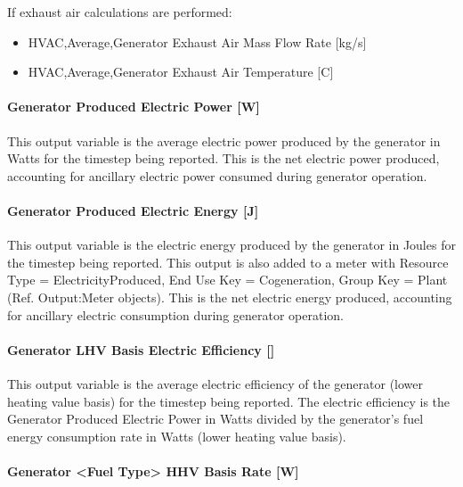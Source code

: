 If exhaust air calculations are performed:

\begin{itemize}
\item
  HVAC,Average,Generator Exhaust Air Mass Flow Rate {[}kg/s{]}
\item
  HVAC,Average,Generator Exhaust Air Temperature {[}C{]}
\end{itemize}

\paragraph{Generator Produced Electric Power {[}W{]}}\label{generator-produced-electric-power-w-1}

This output variable is the average electric power produced by the generator in Watts for the timestep being reported. This is the net electric power produced, accounting for ancillary electric power consumed during generator operation.

\paragraph{Generator Produced Electric Energy {[}J{]}}\label{generator-produced-electric-energy-j-1}

This output variable is the electric energy produced by the generator in Joules for the timestep being reported. This output is also added to a meter with Resource Type = ElectricityProduced, End Use Key = Cogeneration, Group Key = Plant (Ref. Output:Meter objects). This is the net electric energy produced, accounting for ancillary electric consumption during generator operation.

\paragraph{Generator LHV Basis Electric Efficiency {[]}}\label{generator-lhv-basis-electric-efficiency}

This output variable is the average electric efficiency of the generator (lower heating value basis) for the timestep being reported. The electric efficiency is the Generator Produced Electric Power in Watts divided by the generator's fuel energy consumption rate in Watts (lower heating value basis).

\paragraph{Generator \textless{}Fuel Type\textgreater{} HHV Basis Rate {[}W{]}}\label{generator-fuel-type-hhv-basis-rate-w}

